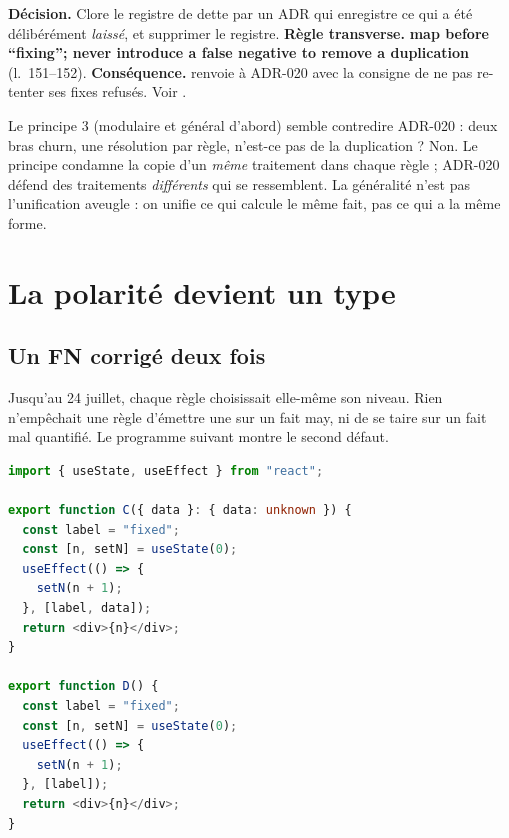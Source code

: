 \begin{decision}
\textbf{Décision.} Clore le registre de dette par un ADR qui enregistre ce qui a été délibérément \emph{laissé}, et supprimer le registre. \textbf{Règle transverse.} \og \textbf{map before ``fixing''; never introduce a false negative to remove a duplication}\fg{} (l.~151--152). \textbf{Conséquence.}  renvoie à ADR-020 avec la consigne de ne pas re-tenter ses fixes refusés. Voir .
\end{decision}

\begin{piege}
Le principe 3 (\og modulaire et général d'abord\fg{}) semble contredire ADR-020 : deux bras churn, une résolution par règle, n'est-ce pas de la duplication ? Non. Le principe condamne la copie d'un \emph{même} traitement dans chaque règle ; ADR-020 défend des traitements \emph{différents} qui se ressemblent. La généralité n'est pas l'unification aveugle : on unifie ce qui calcule le même fait, pas ce qui a la même forme.
\end{piege}

\section{La polarité devient un type}
\label{sec:histoire-doctrine-polarite}

\subsection{Un FN corrigé deux fois}

Jusqu'au 24 juillet, chaque règle choisissait elle-même son niveau. Rien n'empêchait une règle d'émettre une \Error{} sur un fait may, ni de se taire sur un fait mal quantifié. Le programme suivant montre le second défaut.

\begin{lstlisting}[language=TypeScript,caption={\file{/tmp/ch26/ex8.tsx}}]
import { useState, useEffect } from "react";

export function C({ data }: { data: unknown }) {
  const label = "fixed";
  const [n, setN] = useState(0);
  useEffect(() => {
    setN(n + 1);
  }, [label, data]);
  return <div>{n}</div>;
}

export function D() {
  const label = "fixed";
  const [n, setN] = useState(0);
  useEffect(() => {
    setN(n + 1);
  }, [label]);
  return <div>{n}</div>;
}
\end{lstlisting}

